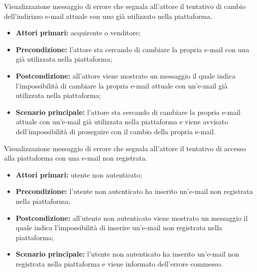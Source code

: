 Visualizzazione messaggio di errore che segnala all'attore il tentativo di cambio dell'indirizzo e-mail attuale con uno già utilizzato nella piattaforma.
\begin{itemize}
    \item \textbf{Attori primari:} acquirente o venditore;
    \item \textbf{Precondizione:} l'attore sta cercando di cambiare la propria e-mail con una già utilizzata nella piattaforma;
    \item \textbf{Postcondizione:} all'attore viene mostrato un messaggio il quale indica l'impossibilità di cambiare la propria e-mail attuale con un'e-mail già utilizzata nella piattaforma;
    \item \textbf{Scenario principale:} l'attore sta cercando di cambiare la propria e-mail attuale con un'e-mail già utilizzata nella piattaforma e viene avvisato dell'impossibilità di proseguire con il cambio della propria e-mail.
\end{itemize}

\label{estensione:email-non-esistente}

Visualizzazione messaggio di errore che segnala all'attore il tentativo di accesso alla piattaforma con una e-mail non registrata.
\begin{itemize}
    \item \textbf{Attori primari:} utente non autenticato;
    \item \textbf{Precondizione:} l'utente non autenticato ha inserito un'e-mail non registrata nella piattaforma;
    \item \textbf{Postcondizione:} all'utente non autenticato viene mostrato un messaggio il quale indica l'impossibilità di inserire un'e-mail non registrata nella piattaforma;
    \item \textbf{Scenario principale:} l'utente non autenticato ha inserito un'e-mail non registrata nella piattaforma e viene informato dell'errore commesso.
\end{itemize}

\label{estensione:credenziali-non-presenti}

